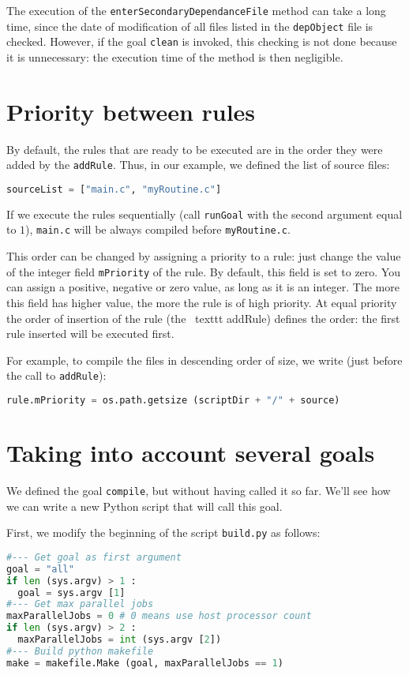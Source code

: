 \documentclass[a4paper,11pt]{extarticle}
\begin{document}
The execution of the \texttt{enterSecondaryDependanceFile} method can take a long time, since the date of modification of all files listed in the \texttt{depObject} file is checked. However, if the goal \texttt{clean} is invoked, this checking is not done because it is unnecessary: the execution time of the method is then negligible.


\section{Priority between rules}

By default, the rules that are ready to be executed are in the order they were added by the \texttt{addRule}. Thus, in our example, we defined the list of source files:
\begin{lstlisting}[language=py]
sourceList = ["main.c", "myRoutine.c"]
\end{lstlisting}
If we execute the rules sequentially (call \texttt{runGoal} with the second argument equal to $1$), \texttt{main.c} will be always compiled before \texttt{myRoutine.c}.

This order can be changed by assigning a priority to a rule: just change the value of the integer field \texttt{mPriority}  of the rule. By default, this field is set to zero. You can assign a positive, negative or zero value, as long as it is an integer. The more this field has higher value, the more the rule is of high priority. At equal priority the order of insertion of the rule (the \ texttt {} addRule) defines the order: the first rule inserted will be executed first.

For example, to compile the files in descending order of size, we write (just before the call to \texttt{addRule}):
\begin{lstlisting}[language=py]
  rule.mPriority = os.path.getsize (scriptDir + "/" + source)
\end{lstlisting}






\section{Taking into account several goals}

We defined the goal \texttt{compile}, but without having called it so far. We'll see how we can write a new Python script that will call this goal.

First, we modify the beginning of the script \texttt{build.py}  as follows:
\begin{lstlisting}[language=py]
#--- Get goal as first argument
goal = "all"
if len (sys.argv) > 1 :
  goal = sys.argv [1]
#--- Get max parallel jobs
maxParallelJobs = 0 # 0 means use host processor count
if len (sys.argv) > 2 :
  maxParallelJobs = int (sys.argv [2])
#--- Build python makefile
make = makefile.Make (goal, maxParallelJobs == 1)
\end{lstlisting}
\end{document}
